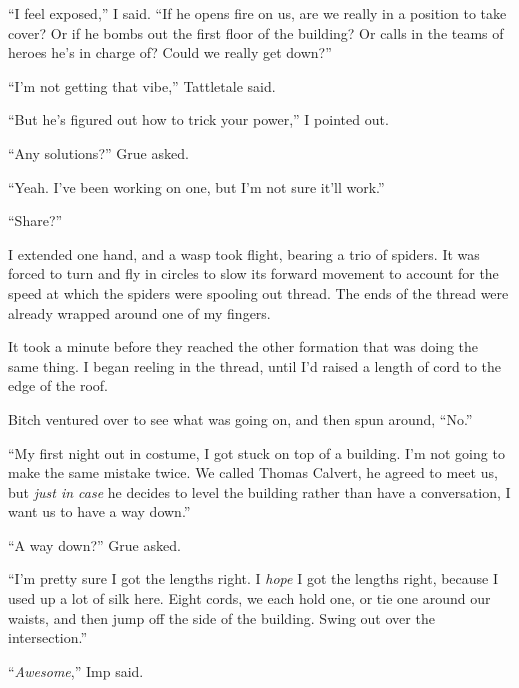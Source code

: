 ``I feel exposed,'' I said.  ``If he opens fire on us, are we really in a position to take cover?  Or if he bombs out the first floor of the building?  Or calls in the teams of heroes he's in charge of?  Could we really get down?''



``I'm not getting that vibe,'' Tattletale said.



``But he's figured out how to trick your power,'' I pointed out.



``Any solutions?'' Grue asked.



``Yeah.  I've been working on one, but I'm not sure it'll work.''



``Share?''



I extended one hand, and a wasp took flight, bearing a trio of spiders.  It was forced to turn and fly in circles to slow its forward movement to account for the speed at which the spiders were spooling out thread.  The ends of the thread were already wrapped around one of my fingers.



It took a minute before they reached the other formation that was doing the same thing.  I began reeling in the thread, until I'd raised a length of cord to the edge of the roof.



Bitch ventured over to see what was going on, and then spun around, ``No.''



``My first night out in costume, I got stuck on top of a building.  I'm not going to make the same mistake twice.  We called Thomas Calvert, he agreed to meet us, but \emph{just in case} he decides to level the building rather than have a conversation, I want us to have a way down.''



``A way down?'' Grue asked.



``I'm pretty sure I got the lengths right.  I \emph{hope} I got the lengths right, because I used up a lot of silk here.  Eight cords, we each hold one, or tie one around our waists, and then jump off the side of the building.  Swing out over the intersection.''



``\emph{Awesome},'' Imp said.



